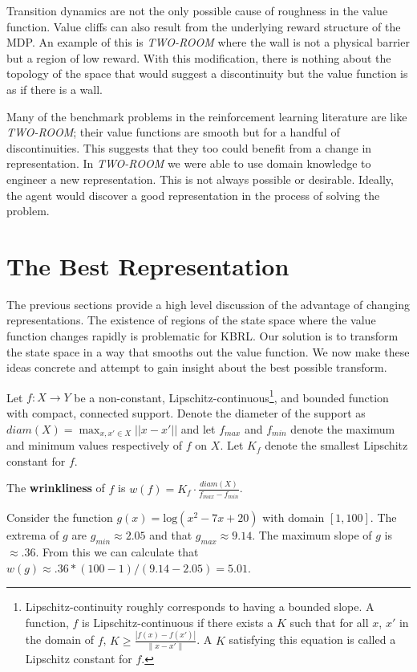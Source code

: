 Transition dynamics are not the only possible cause of roughness in
the value function.
Value cliffs can also result from the underlying reward structure of the MDP.
An example of this is \textit{TWO-ROOM} where the wall is not a physical
barrier but a region of low reward.
With this modification, there is nothing about the topology of the space that
would suggest a discontinuity but the value function is as if there is a wall.

Many of the benchmark problems in the reinforcement learning literature are
like \textit{TWO-ROOM};
their value functions are smooth but for a handful of discontinuities.
This suggests that they too could benefit from a change in representation.
In \textit{TWO-ROOM} we were able to use domain knowledge to engineer a new
representation. This is not always possible or desirable.
Ideally, the agent would discover a good representation in the process
of solving the problem.

\section{The Best Representation}
The previous sections provide a high level discussion of the advantage of
changing representations.
The existence of regions of the state space where the value function
changes rapidly is problematic for KBRL.
Our solution is to transform the state space in a way that smooths out the
value function.
We now make these ideas concrete and attempt to gain insight about the
best possible transform.

Let $f:X \to Y$ be a non-constant, Lipschitz-continuous\footnote{
Lipschitz-continuity roughly corresponds to having a bounded slope.
A function, $f$ is Lipschitz-continuous if there exists a $K$ such that
for all $x$, $x'$ in the domain of $f$,
$K \geq \frac{|f(x) - f(x')|}{\|x - x'\|}$.
A $K$ satisfying this equation is called a Lipschitz constant for $f$.},
and bounded function with compact, connected support.
Denote the diameter of the support as $diam(X) = \max_{x,x' \in X}||x - x'||$
and let $f_{max}$ and $f_{min}$ denote the maximum and minimum values 
respectively of $f$ on $X$.
Let $K_f$ denote the smallest Lipschitz constant for $f$.

\begin{definition}
The \textbf{wrinkliness} of $f$ is
$w(f) = K_f \cdot \frac{diam(X)}{f_{max} - f_{min}}$.
\end{definition}

Consider the function $g(x) = \mathrm{log}(x^2-7x+20)$ with domain $[1,100]$.
The extrema of $g$ are $g_{min} \approx 2.05$ and that $g_{max} \approx 9.14$.
The maximum slope of $g$ is $\approx .36$.
From this we can calculate that $w(g)\approx.36*(100-1)/(9.14-2.05) = 5.01$.

